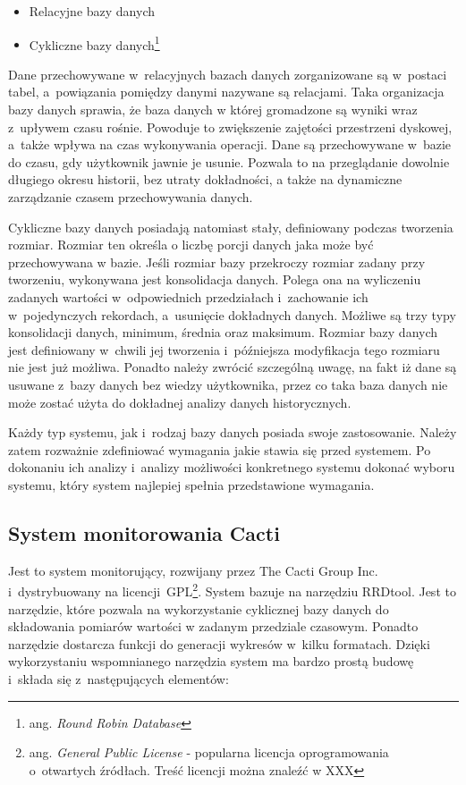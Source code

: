 \begin{itemize}
\item Relacyjne bazy danych
\item Cykliczne bazy danych\footnote{ang. {\em Round Robin Database}}
\end{itemize}

Dane przechowywane w~relacyjnych bazach danych zorganizowane są
w~postaci tabel, a~powiązania pomiędzy danymi nazywane są
relacjami. Taka organizacja bazy danych sprawia, że baza danych w
której gromadzone są wyniki wraz z~upływem czasu rośnie. Powoduje to
zwiększenie zajętości przestrzeni dyskowej, a~także wpływa na czas
wykonywania operacji. Dane są przechowywane w~bazie do czasu, gdy
użytkownik jawnie je usunie. Pozwala to na przeglądanie dowolnie
długiego okresu historii, bez utraty dokładności, a także na
dynamiczne zarządzanie czasem przechowywania danych.

Cykliczne bazy danych posiadają natomiast stały, definiowany podczas
tworzenia rozmiar. Rozmiar ten określa o liczbę porcji danych jaka
może być przechowywana w bazie. Jeśli rozmiar bazy przekroczy rozmiar
zadany przy tworzeniu, wykonywana jest konsolidacja danych. Polega ona
na wyliczeniu zadanych wartości w~odpowiednich przedziałach
i~zachowanie ich w~pojedynczych rekordach, a~usunięcie dokładnych
danych. Możliwe są trzy typy konsolidacji danych, minimum, średnia
oraz maksimum. Rozmiar bazy danych jest definiowany w~chwili jej
tworzenia i~późniejsza modyfikacja tego rozmiaru nie jest już
możliwa. Ponadto należy zwrócić szczególną uwagę, na fakt iż dane są
usuwane z~bazy danych bez wiedzy użytkownika, przez co taka baza
danych nie może zostać użyta do dokładnej analizy danych
historycznych.

Każdy typ systemu, jak i~rodzaj bazy danych posiada swoje
zastosowanie. Należy zatem rozważnie zdefiniować wymagania jakie
stawia się przed systemem. Po dokonaniu ich analizy i~analizy
możliwości konkretnego systemu dokonać wyboru systemu, który system
najlepiej spełnia przedstawione wymagania.

\subsection[Cacti][System monitorowania Cacti]{System monitorowania Cacti}

Jest to system monitorujący, rozwijany przez The Cacti Group
Inc. i~dystrybuowany na licencji~GPL\footnote{ ang. {\em General
    Public License} - popularna licencja oprogramowania o~otwartych
  źródłach. Treść licencji można znaleźć w XXX}. System bazuje na
narzędziu RRDtool. Jest to narzędzie, które pozwala na wykorzystanie
cyklicznej bazy danych do składowania pomiarów wartości w zadanym
przedziale czasowym. Ponadto narzędzie dostarcza funkcji do generacji
wykresów w~kilku formatach. Dzięki wykorzystaniu wspomnianego
narzędzia system ma bardzo prostą budowę i~składa się z~następujących
elementów:

